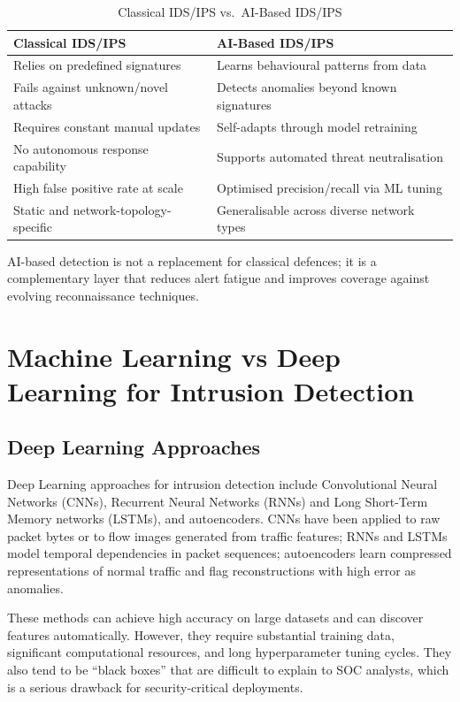 \begin{table}[H]
\centering
\caption{Classical IDS/IPS vs.\ AI-Based IDS/IPS}
\label{tab:ids-comparison}
\begin{tabularx}{\textwidth}{XX}
\toprule
\textbf{Classical IDS/IPS} & \textbf{AI-Based IDS/IPS} \\
\midrule
Relies on predefined signatures & Learns behavioural patterns from data \\
Fails against unknown/novel attacks & Detects anomalies beyond known signatures \\
Requires constant manual updates & Self-adapts through model retraining \\
No autonomous response capability & Supports automated threat neutralisation \\
High false positive rate at scale & Optimised precision/recall via ML tuning \\
Static and network-topology-specific & Generalisable across diverse network types \\
\bottomrule
\end{tabularx}
\end{table}

AI-based detection is not a replacement for classical defences; it is a complementary layer that reduces alert fatigue and improves coverage against evolving reconnaissance techniques.

\section{Machine Learning vs Deep Learning for Intrusion Detection}\label{sec:ml_dl}

\subsection{Deep Learning Approaches}

Deep Learning approaches for intrusion detection include Convolutional Neural Networks (CNNs), Recurrent Neural Networks (RNNs) and Long Short-Term Memory networks (LSTMs), and autoencoders. CNNs have been applied to raw packet bytes or to flow images generated from traffic features; RNNs and LSTMs model temporal dependencies in packet sequences; autoencoders learn compressed representations of normal traffic and flag reconstructions with high error as anomalies.

These methods can achieve high accuracy on large datasets and can discover features automatically. However, they require substantial training data, significant computational resources, and long hyperparameter tuning cycles. They also tend to be ``black boxes'' that are difficult to explain to SOC analysts, which is a serious drawback for security-critical deployments.

